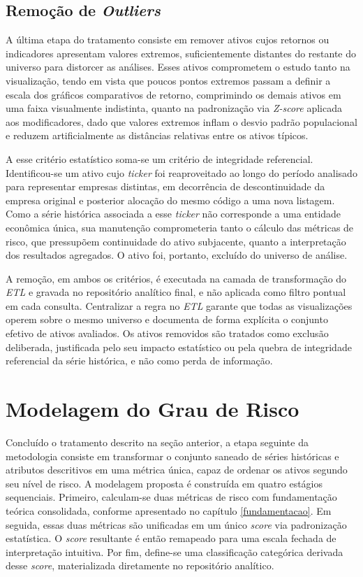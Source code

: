 \subsection{Remoção de \textit{Outliers}}

A última etapa do tratamento consiste em remover ativos cujos retornos ou indicadores apresentam valores extremos, suficientemente distantes do restante do universo para distorcer as análises. Esses ativos comprometem o estudo tanto na visualização, tendo em vista que poucos pontos extremos passam a definir a escala dos gráficos comparativos de retorno, comprimindo os demais ativos em uma faixa visualmente indistinta, quanto na padronização via \textit{Z-score} aplicada aos modificadores, dado que valores extremos inflam o desvio padrão populacional e reduzem artificialmente as distâncias relativas entre os ativos típicos.

A esse critério estatístico soma-se um critério de integridade referencial. Identificou-se um ativo cujo \textit{ticker} foi reaproveitado ao longo do período analisado para representar empresas distintas, em decorrência de descontinuidade da empresa original e posterior alocação do mesmo código a uma nova listagem. Como a série histórica associada a esse \textit{ticker} não corresponde a uma entidade econômica única, sua manutenção comprometeria tanto o cálculo das métricas de risco, que pressupõem continuidade do ativo subjacente, quanto a interpretação dos resultados agregados. O ativo foi, portanto, excluído do universo de análise.

A remoção, em ambos os critérios, é executada na camada de transformação do \textit{ETL} e gravada no repositório analítico final, e não aplicada como filtro pontual em cada consulta. Centralizar a regra no \textit{ETL} garante que todas as visualizações operem sobre o mesmo universo e documenta de forma explícita o conjunto efetivo de ativos avaliados. Os ativos removidos são tratados como exclusão deliberada, justificada pelo seu impacto estatístico ou pela quebra de integridade referencial da série histórica, e não como perda de informação.

\section{Modelagem do Grau de Risco}
\label{sec:modelagem-risco}

Concluído o tratamento descrito na seção anterior, a etapa seguinte da metodologia consiste em transformar o conjunto saneado de séries históricas e atributos descritivos em uma métrica única, capaz de ordenar os ativos segundo seu nível de risco. A modelagem proposta é construída em quatro estágios sequenciais. Primeiro, calculam-se duas métricas de risco com fundamentação teórica consolidada, conforme apresentado no capítulo \ref{fundamentacao}. Em seguida, essas duas métricas são unificadas em um único \textit{score} via padronização estatística. O \textit{score} resultante é então remapeado para uma escala fechada de interpretação intuitiva. Por fim, define-se uma classificação categórica derivada desse \textit{score}, materializada diretamente no repositório analítico.

